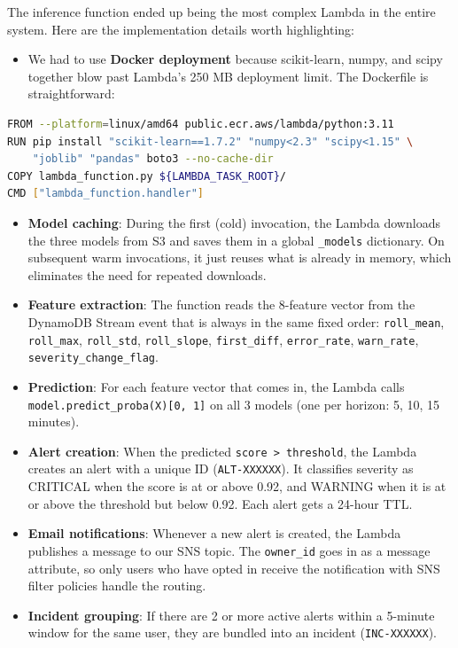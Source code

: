 \documentclass[11pt,a4paper]{article}
\begin{document}
The inference function ended up being the most complex Lambda in the entire system. Here are the implementation details worth highlighting:

\begin{itemize}[leftmargin=2em]
    \item We had to use \textbf{Docker deployment} because scikit-learn, numpy, and scipy together blow past Lambda's 250 MB deployment limit. The Dockerfile is straightforward:
\end{itemize}

\begin{lstlisting}[language=bash, caption={Inference Lambda Dockerfile}]
FROM --platform=linux/amd64 public.ecr.aws/lambda/python:3.11
RUN pip install "scikit-learn==1.7.2" "numpy<2.3" "scipy<1.15" \
    "joblib" "pandas" boto3 --no-cache-dir
COPY lambda_function.py ${LAMBDA_TASK_ROOT}/
CMD ["lambda_function.handler"]
\end{lstlisting}

\begin{itemize}[leftmargin=2em]
    \item \textbf{Model caching}: During the first (cold) invocation, the Lambda downloads the three models from S3 and saves them in a global \texttt{\_models} dictionary. On subsequent warm invocations, it just reuses what is already in memory, which eliminates the need for repeated downloads.
    \item \textbf{Feature extraction}: The function reads the 8-feature vector from the DynamoDB Stream event that is always in the same fixed order: \texttt{roll\_mean}, \texttt{roll\_max}, \texttt{roll\_std}, \texttt{roll\_slope}, \texttt{first\_diff}, \texttt{error\_rate}, \texttt{warn\_rate}, \texttt{severity\_change\_flag}.
    \item \textbf{Prediction}: For each feature vector that comes in, the Lambda calls \texttt{model.predict\_proba(X)[0, 1]} on all 3 models (one per horizon: 5, 10, 15 minutes).
    \item \textbf{Alert creation}: When the predicted \texttt{score > threshold}, the Lambda creates an alert with a unique ID (\texttt{ALT-XXXXXX}). It classifies severity as CRITICAL when the score is at or above 0.92, and WARNING when it is at or above the threshold but below 0.92. Each alert gets a 24-hour TTL.
    \item \textbf{Email notifications}: Whenever a new alert is created, the Lambda publishes a message to our SNS topic. The \texttt{owner\_id} goes in as a message attribute, so only users who have opted in receive the notification with SNS filter policies handle the routing.
    \item \textbf{Incident grouping}: If there are 2 or more active alerts within a 5-minute window for the same user, they are bundled into an incident (\texttt{INC-XXXXXX}).
\end{itemize}
\end{document}
